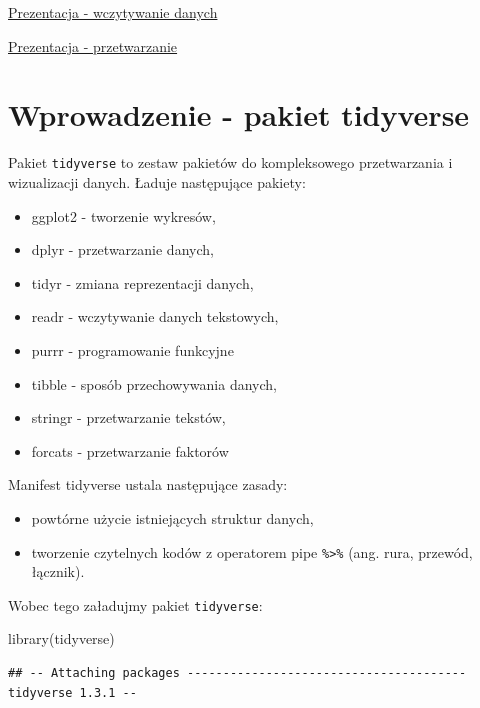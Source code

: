 \documentclass[
]{book}
\newenvironment{Shaded}{\begin{snugshade}}{\end{snugshade}}
\newcommand{\FunctionTok}[1]{\textcolor[rgb]{0.00,0.00,0.00}{#1}}
\newcommand{\NormalTok}[1]{#1}
\providecommand{\tightlist}{%
  \setlength{\itemsep}{0pt}\setlength{\parskip}{0pt}}
\begin{document}
\href{presentations/02_wczytywanie.html}{Prezentacja - wczytywanie danych}

\href{presentations/03_przetwarzanie.html}{Prezentacja - przetwarzanie}

\hypertarget{wprowadzenie---pakiet-tidyverse}{%
\section{Wprowadzenie - pakiet tidyverse}\label{wprowadzenie---pakiet-tidyverse}}

Pakiet \texttt{tidyverse} to zestaw pakietów do kompleksowego przetwarzania i wizualizacji danych. Ładuje następujące pakiety:

\begin{itemize}
\tightlist
\item
  ggplot2 - tworzenie wykresów,
\item
  dplyr - przetwarzanie danych,
\item
  tidyr - zmiana reprezentacji danych,
\item
  readr - wczytywanie danych tekstowych,
\item
  purrr - programowanie funkcyjne
\item
  tibble - sposób przechowywania danych,
\item
  stringr - przetwarzanie tekstów,
\item
  forcats - przetwarzanie faktorów
\end{itemize}

Manifest tidyverse ustala następujące zasady:

\begin{itemize}
\tightlist
\item
  powtórne użycie istniejących struktur danych,
\item
  tworzenie czytelnych kodów z operatorem pipe \texttt{\%\textgreater{}\%} (ang. rura, przewód, łącznik).
\end{itemize}

Wobec tego załadujmy pakiet \texttt{tidyverse}:

\begin{Shaded}
\begin{Highlighting}[]
\FunctionTok{library}\NormalTok{(tidyverse)}
\end{Highlighting}
\end{Shaded}

\begin{verbatim}
## -- Attaching packages --------------------------------------- tidyverse 1.3.1 --
\end{verbatim}
\end{document}
